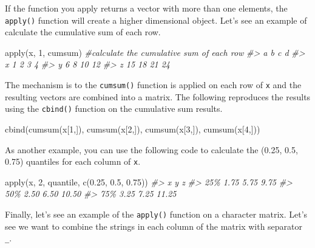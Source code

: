 \documentclass[
]{book}
\newenvironment{Shaded}{\begin{snugshade}}{\end{snugshade}}
\newcommand{\CommentTok}[1]{\textcolor[rgb]{0.56,0.35,0.01}{\textit{#1}}}
\newcommand{\DecValTok}[1]{\textcolor[rgb]{0.00,0.00,0.81}{#1}}
\newcommand{\FloatTok}[1]{\textcolor[rgb]{0.00,0.00,0.81}{#1}}
\newcommand{\FunctionTok}[1]{\textcolor[rgb]{0.00,0.00,0.00}{#1}}
\newcommand{\NormalTok}[1]{#1}
\begin{document}
If the function you apply returns a vector with more than one elements, the \texttt{apply()} function will create a higher dimensional object. Let's see an example of calculate the cumulative sum of each row.

\begin{Shaded}
\begin{Highlighting}[]
\FunctionTok{apply}\NormalTok{(x, }\DecValTok{1}\NormalTok{, cumsum) }\CommentTok{\#calculate the cumulative sum of each row}
\CommentTok{\#\textgreater{}    a  b  c  d}
\CommentTok{\#\textgreater{} x  1  2  3  4}
\CommentTok{\#\textgreater{} y  6  8 10 12}
\CommentTok{\#\textgreater{} z 15 18 21 24}
\end{Highlighting}
\end{Shaded}

The mechanism is to the \texttt{cumsum()} function is applied on each row of \texttt{x} and the resulting vectors are combined into a matrix. The following reproduces the results using the \texttt{cbind()} function on the cumulative sum results.

\begin{Shaded}
\begin{Highlighting}[]
\FunctionTok{cbind}\NormalTok{(}\FunctionTok{cumsum}\NormalTok{(x[}\DecValTok{1}\NormalTok{,]), }\FunctionTok{cumsum}\NormalTok{(x[}\DecValTok{2}\NormalTok{,]), }\FunctionTok{cumsum}\NormalTok{(x[}\DecValTok{3}\NormalTok{,]), }\FunctionTok{cumsum}\NormalTok{(x[}\DecValTok{4}\NormalTok{,]))}
\end{Highlighting}
\end{Shaded}

As another example, you can use the following code to calculate the (0.25, 0.5, 0.75) quantiles for each column of \texttt{x}.

\begin{Shaded}
\begin{Highlighting}[]
\FunctionTok{apply}\NormalTok{(x, }\DecValTok{2}\NormalTok{, quantile, }\FunctionTok{c}\NormalTok{(}\FloatTok{0.25}\NormalTok{, }\FloatTok{0.5}\NormalTok{, }\FloatTok{0.75}\NormalTok{))}
\CommentTok{\#\textgreater{}        x    y     z}
\CommentTok{\#\textgreater{} 25\% 1.75 5.75  9.75}
\CommentTok{\#\textgreater{} 50\% 2.50 6.50 10.50}
\CommentTok{\#\textgreater{} 75\% 3.25 7.25 11.25}
\end{Highlighting}
\end{Shaded}

Finally, let's see an example of the \texttt{apply()} function on a character matrix. Let's see we want to combine the strings in each column of the matrix with separator \texttt{\_}.
\end{document}
